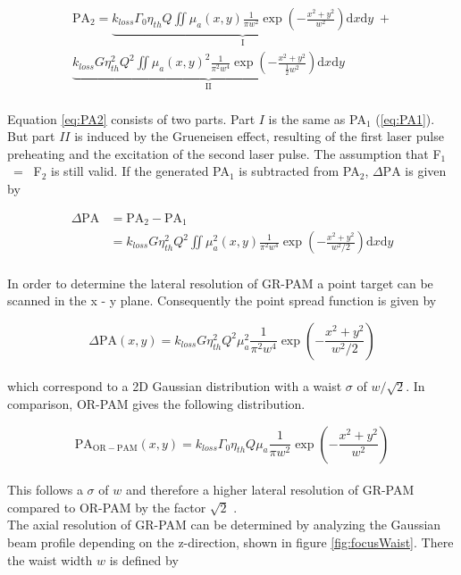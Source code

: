 \begin{multline}
	\mathrm{PA}_2 = \underbrace{k_{loss} \Gamma_0 \eta_{th} Q \iint \mu_a(x,y) \frac{1}{\pi w^2} \exp{\left(-\frac{x^2+y^2}{w^2}\right)} \mathrm{d}x \mathrm{d}y}_{\mathrm{I}} \; + \\ \underbrace{k_{loss} G \eta_{th}^2 Q^2 \iint \mu_a(x,y)^2 \frac{1}{\pi^2 w^4} \exp{\left(-\frac{x^2+y^2}{\frac{1}{2}w^2}\right)} \mathrm{d}x\mathrm{d}y}_{\mathrm{II}}
	\label{eq:PA2}
\end{multline}
\\
Equation \ref{eq:PA2} consists of two parts. Part $I$ is the same as PA$_1$ (\ref{eq:PA1}). But part $II$ is induced by the Grueneisen effect, resulting of the first laser pulse preheating and the excitation of the second laser pulse. The assumption that F$_1$~= ~F$_2$ is still valid. If the generated PA$_1$ is subtracted from PA$_2$, $\Delta \mathrm{PA}$ is given by

\begin{equation}
\begin{split}
	\Delta \mathrm{PA} &= \mathrm{PA}_2 - \mathrm{PA}_1\\
	&= k_{loss} G \eta_{th}^2 Q^2 \iint \mu_a^2(x,y) \frac{1}{\pi^2w^4} \exp{\left(-\frac{x^2+y^2}{w^2/2}\right)} \mathrm{d}x\mathrm{d}y
	\end{split}
\end{equation}
\\
In order to determine the lateral resolution of GR-PAM a point target can be scanned in the x - y plane. Consequently the point spread function is given by 

\begin{equation}
\Delta \mathrm{PA} (x,y) = k_{loss} G \eta_{th}^2 Q^2 \mu_a^2 \frac{1}{\pi^2w^4} \exp{\left(-\frac{x^2+y^2}{w^2/2}\right)} 
\end{equation}
\\
which correspond to a 2D Gaussian distribution with a waist $\sigma$ of $w/\sqrt{2}$. In comparison, OR-PAM gives the following distribution. 

\begin{equation}
\mathrm{PA_{OR-PAM}} (x,y) = k_{loss} \Gamma_0 \eta_{th} Q \mu_a \frac{1}{\pi w^2} \exp{\left(-\frac{x^2+y^2}{w^2}\right)} 
\end{equation}
\\
This follows a $\sigma$ of $w$ and therefore a higher lateral resolution of GR-PAM compared to OR-PAM by the factor $\sqrt{2}$ \cite{PhysRevLett.113.174301}.\\
The axial resolution of GR-PAM can be determined by analyzing the Gaussian beam profile depending on the z-direction, shown in figure \ref{fig:focusWaist}.
There the waist width $w$ is defined by

